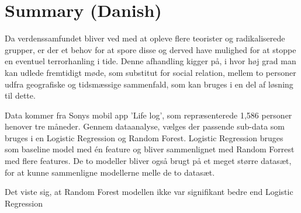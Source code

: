 \chapter{Summary (Danish)}
\begin{otherlanguage}{danish}

Da verdenssamfundet bliver ved med at opleve flere teorister og radikaliserede grupper, er der et behov for at spore disse og derved have mulighed for at stoppe en eventuel terrorhanling i tide. Denne afhandling kigger på, i hvor høj grad man kan udlede fremtidigt møde, som substitut for social relation, mellem to personer udfra geografiske og tidsmæssige sammenfald, som kan bruges i en del af løsning til dette. 

Data kommer fra Sonys mobil app 'Life log', som repræsenterede 1,586 personer henover tre måneder. Gennem dataanalyse, vælges der passende sub-data som bruges i en Logistic Regression og Random Forest. Logistic Regression bruges som baseline model med én feature og bliver sammenlignet med Random Forrest med flere features. De to modeller bliver også brugt på et meget større datasæt, for at kunne sammenligne modellerne melle de to datasæt. 

Det viste sig, at Random Forest modellen ikke var signifikant bedre end Logistic Regression

\end{otherlanguage}